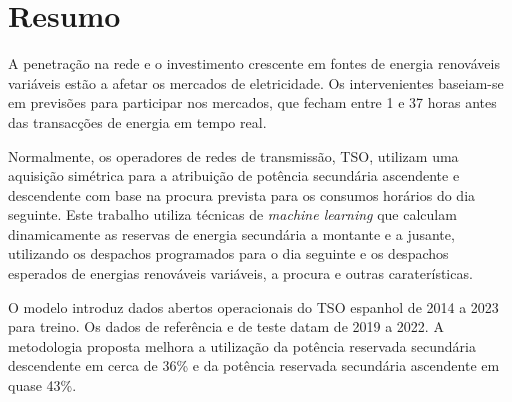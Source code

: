 \chapter{Resumo}
\justifying
A penetração na rede e o investimento crescente em fontes de energia renováveis variáveis estão a afetar os mercados de eletricidade. Os intervenientes baseiam-se em previsões para participar nos mercados, que fecham entre 1 e 37 horas antes das transacções de energia em tempo real.\par
Normalmente, os operadores de redes de transmissão, \gls{TSO}, utilizam uma aquisição simétrica para a atribuição de potência secundária ascendente e descendente com base na procura prevista para os consumos horários do dia seguinte. Este trabalho utiliza técnicas de \emph{machine learning} que calculam dinamicamente as reservas de energia secundária a montante e a jusante, utilizando os despachos programados para o dia seguinte e os despachos esperados de energias renováveis variáveis, a procura e outras caraterísticas.\par
O modelo introduz dados abertos operacionais do \gls{TSO} espanhol de 2014 a 2023 para treino. Os dados de referência e de teste datam de 2019 a 2022. A metodologia proposta melhora a utilização da potência reservada secundária descendente em cerca de 36\% e da potência reservada secundária ascendente em quase 43\%. \par


\vspace{0.5cm} %

